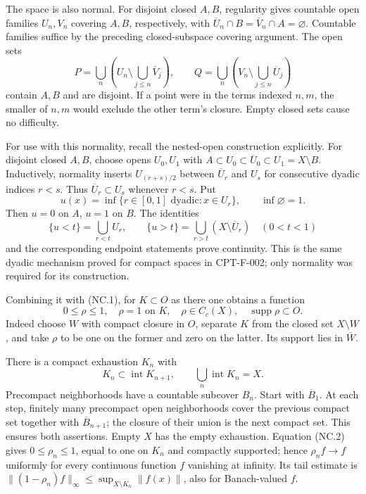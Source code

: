 \documentclass[
  11pt,
]{article}
\begin{document}
The space is also normal. For disjoint closed \(A,B\), regularity gives
countable open families \(U_n,V_n\) covering \(A,B\), respectively, with
\(\overline U_n\cap B=\overline V_n\cap A=\varnothing\). Countable
families suffice by the preceding closed-subspace covering argument. The
open sets \[
 P=\bigcup_n\left(U_n\setminus\bigcup_{j\leq n}\overline V_j\right),
 \qquad
 Q=\bigcup_n\left(V_n\setminus\bigcup_{j\leq n}\overline U_j\right)
\] contain \(A,B\) and are disjoint. If a point were in the terms
indexed \(n,m\), the smaller of \(n,m\) would exclude the other term's
closure. Empty closed sets cause no difficulty.

For use with this normality, recall the nested-open construction
explicitly. For disjoint closed \(A,B\), choose opens \(U_0,U_1\) with
\(A\subset U_0\subset\overline U_0\subset U_1=X\setminus B\).
Inductively, normality inserts \(U_{(r+s)/2}\) between \(\overline U_r\)
and \(U_s\) for consecutive dyadic indices \(r<s\). Thus
\(\overline U_r\subset U_s\) whenever \(r<s\). Put \[
 u(x)=\inf\{r\in[0,1]\text{ dyadic}:x\in U_r\},
 \qquad \inf\varnothing=1.
\] Then \(u=0\) on \(A\), \(u=1\) on \(B\). The identities \[
 \{u<t\}=\bigcup_{r<t}U_r,\qquad
 \{u>t\}=\bigcup_{r>t}(X\setminus\overline U_r)
 \quad(0<t<1)
\] and the corresponding endpoint statements prove continuity. This is
the same dyadic mechanism proved for compact spaces in CPT-F-002; only
normality was required for its construction.

Combining it with (NC.1), for \(K\subset O\) as there one obtains a
function \[
 0\leq\rho\leq1,\quad \rho=1\text{ on }K,\quad
 \rho\in C_c(X),\quad\operatorname{supp}\rho\subset O.       \tag{NC.2}
\] Indeed choose \(W\) with compact closure in \(O\), separate \(K\)
from the closed set \(X\setminus W\), and take \(\rho\) to be one on the
former and zero on the latter. Its support lies in \(\overline W\).

There is a compact exhaustion \(K_n\) with \[
 K_n\subset\operatorname{int}K_{n+1},\qquad
 \bigcup_n\operatorname{int}K_n=X.                       \tag{NC.3}
\] Precompact neighborhoods have a countable subcover \(B_n\). Start
with \(\overline B_1\). At each step, finitely many precompact open
neighborhoods cover the previous compact set together with
\(\overline B_{n+1}\); the closure of their union is the next compact
set. This ensures both assertions. Empty \(X\) has the empty exhaustion.
Equation (NC.2) gives \(0\leq\rho_n\leq1\), equal to one on \(K_n\) and
compactly supported; hence \(\rho_n f\to f\) uniformly for every
continuous function \(f\) vanishing at infinity. Its tail estimate is
\(\|(1-\rho_n)f\|_\infty\leq\sup_{X\setminus K_n}\|f(x)\|\), also for
Banach-valued \(f\).
\end{document}
